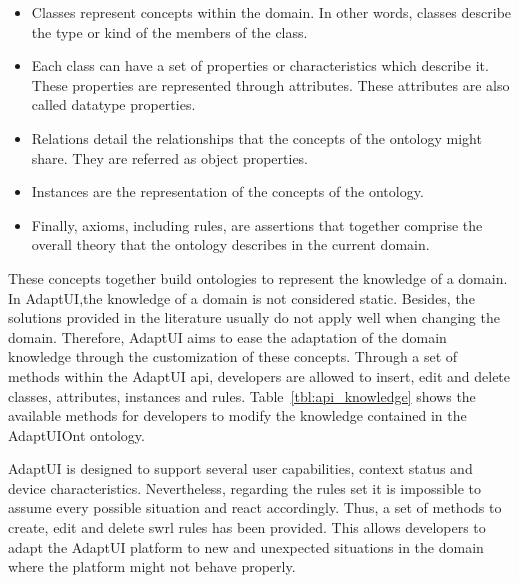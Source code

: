 \begin{itemize}
  \item Classes represent concepts within the domain. In other words, classes
  describe the type or kind of the members of the class.
  
  \item Each class can have a set of properties or characteristics which describe
  it. These properties are represented through attributes. These attributes
  are also called datatype properties.
  
  \item Relations detail the relationships that the concepts of the ontology
  might share. They are referred as object properties.
  \item Instances are the representation of the concepts of the
  ontology.
  
  \item Finally, axioms, including rules, are assertions that together comprise
  the overall theory that the ontology describes in the current domain.
\end{itemize}

These concepts together build ontologies to represent the knowledge of a domain.
In AdaptUI,the knowledge of a domain is not considered static. Besides, the 
solutions provided in the literature usually do not apply well when changing 
the domain. Therefore, AdaptUI aims to ease the adaptation of the domain 
knowledge through the customization of these concepts. Through a set of methods 
within the AdaptUI \ac{api}, developers are allowed to insert, edit and delete 
classes, attributes, instances and rules. Table~\ref{tbl:api_knowledge} shows 
the available methods for developers to modify the knowledge contained in the 
AdaptUIOnt ontology.

AdaptUI is designed to support several user capabilities, context status and
device characteristics. Nevertheless, regarding the rules set it is impossible
to assume every possible situation and react accordingly. Thus, a set of methods
to create, edit and delete \ac{swrl} rules has been provided. This allows developers
to adapt the AdaptUI platform to new and unexpected situations in the domain
where the platform might not behave properly.


